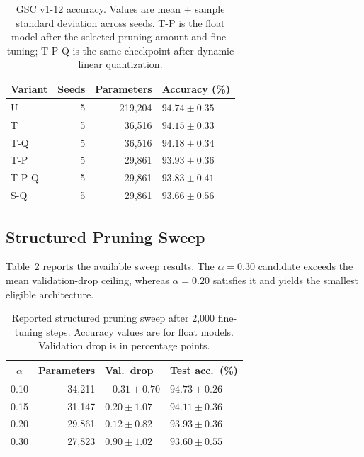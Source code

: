 \documentclass[journal]{IEEEtran}
\begin{document}
\begin{table}[t]
\caption{GSC v1-12 accuracy.
Values are mean $\pm$ sample standard deviation across seeds.
T-P is the float model after the selected pruning amount and
fine-tuning; T-P-Q is the same checkpoint after dynamic linear
quantization.}
\label{tab:accuracy}
\centering
\footnotesize
\begin{tabular}{lrrl}
\toprule
Variant & Seeds & Parameters & Accuracy (\%)\\
\midrule
U & 5 & 219,204 & $94.74\pm0.35$\\
T & 5 & 36,516 & $94.15\pm0.33$\\
T-Q & 5 & 36,516 & $94.18\pm0.34$\\
T-P & 5 & 29,861 & $93.93\pm0.36$\\
T-P-Q & 5 & 29,861 & $93.83\pm0.41$\\
S-Q & 5 & 29,861 & $93.66\pm0.56$\\
\bottomrule
\end{tabular}
\end{table}

\subsection{Structured Pruning Sweep}

Table~\ref{tab:sweep} reports the available sweep results.
The $\alpha=0.30$ candidate exceeds the mean validation-drop
ceiling, whereas $\alpha=0.20$ satisfies it and yields the
smallest eligible architecture.

\begin{table}[t]
\caption{Reported structured pruning sweep after 2,000
fine-tuning steps. Accuracy values are for float models.
Validation drop is in percentage points.}
\label{tab:sweep}
\centering
\footnotesize
\begin{tabular}{crll}
\toprule
$\alpha$ & Parameters & Val.\ drop & Test acc.\ (\%)\\
\midrule
0.10 & 34,211 & $-0.31\pm0.70$ & $94.73\pm0.26$\\
0.15 & 31,147 & $0.20\pm1.07$ & $94.11\pm0.36$\\
0.20 & 29,861 & $0.12\pm0.82$ & $93.93\pm0.36$\\
0.30 & 27,823 & $0.90\pm1.02$ & $93.60\pm0.55$\\
\bottomrule
\end{tabular}
\end{table}
\end{document}
